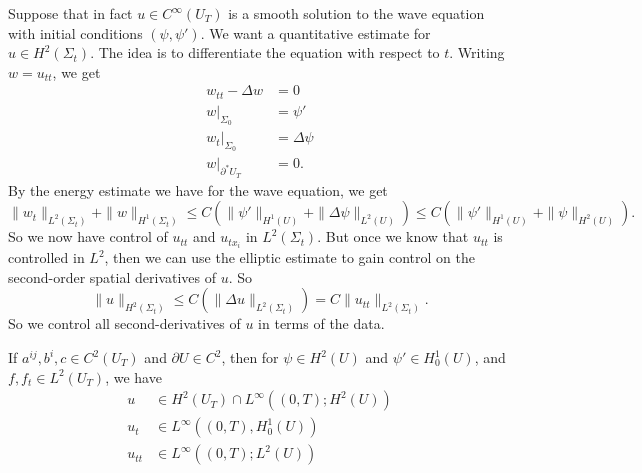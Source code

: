 \documentclass[a4paper]{article}
\begin{document}
Suppose that in fact $u \in C^\infty(U_T)$ is a smooth solution to the wave equation with initial conditions $(\psi, \psi')$. We want a quantitative estimate for $u \in H^2(\Sigma_t)$. The idea is to differentiate the equation with respect to $t$. Writing $w = u_{tt}$, we get
\begin{align*}
  w_{tt} - \Delta w &= 0\\
  w|_{\Sigma_0} &= \psi'\\
  w_t|_{\Sigma_0} &= \Delta \psi\\
  w|_{\partial^* U_T} &= 0.
\end{align*}
By the energy estimate we have for the wave equation, we get
\[
  \|w_t\|_{L^2(\Sigma_t)} + \|w\|_{H^1(\Sigma_t)} \leq C(\|\psi'\|_{H^1(U)} + \|\Delta \psi\|_{L^2(U)}) \leq C(\|\psi'\|_{H^1(U)} + \|\psi\|_{H^2(U)}).
\]
So we now have control of $u_{tt}$ and $u_{tx_i}$ in $L^2(\Sigma_t)$. But once we know that $u_{tt}$ is controlled in $L^2$, then we can use the elliptic estimate to gain control on the second-order spatial derivatives of $u$. So
\[
  \|u\|_{H^2(\Sigma_t)}\leq C(\|\Delta u\|_{L^2(\Sigma_t)}) = C \|u_{tt}\|_{L^2(\Sigma_t)}.
\]
So we control all second-derivatives of $u$ in terms of the data.

\begin{thm}
  If $a^{ij}, b^i, c \in C^2(U_T)$ and $\partial U \in C^2$, then for $\psi \in H^2(U)$ and $\psi' \in H_0^1(U)$, and $f, f_t \in L^2(U_T)$, we have
  \begin{align*}
    u &\in H^2(U_T) \cap L^\infty((0, T); H^2(U))\\
    u_t &\in L^\infty((0, T), H_0^1(U))\\
    u_{tt} &\in L^\infty((0, T); L^2(U))
  \end{align*}
\end{thm}
\end{document}
